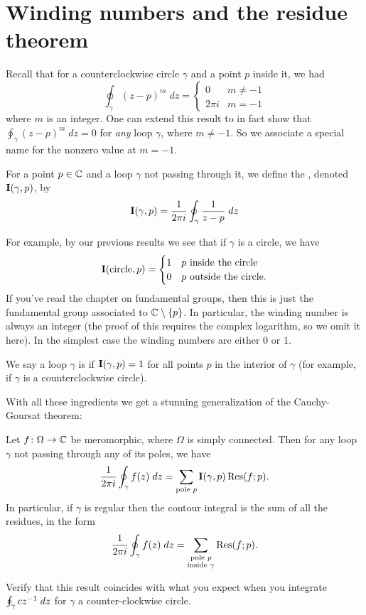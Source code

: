 \section{Winding numbers and the residue theorem}
Recall that for a counterclockwise circle $\gamma$ and a point $p$ inside it, we had
\[
	\oint_{\gamma} (z-p)^m \; dz =
	\begin{cases}
		0 & m \neq -1 \\
		2\pi i & m = -1
	\end{cases}
\]
where $m$ is an integer.
One can extend this result to in fact show that $\oint_\gamma (z-p)^m \; dz = 0$
for \emph{any} loop $\gamma$, where $m \neq -1$.
So we associate a special name for the nonzero value at $m=-1$.
\begin{definition}
	For a point $p \in \mathbb C$ and a loop $\gamma$ not passing through it,
	we define the , denoted $\operatorname{\mathbf I}(\gamma, p)$, by
	\[
		\operatorname{\mathbf I}(\gamma, p) = \frac{1}{2\pi i} \oint_{\gamma} \frac{1}{z-p} \; dz
	\]
\end{definition}
For example, by our previous results we see that if $\gamma$ is a circle, we have
\[
	\operatorname{\mathbf I}(\text{circle}, p)
	=
	\begin{cases}
		1 & \text{$p$ inside the circle} \\
		0 & \text{$p$ outside the circle}.
	\end{cases}
\]
If you've read the chapter on fundamental groups, then this is just the fundamental group
associated to $\mathbb C \setminus \{p\}$.
In particular, the winding number is always an integer (the proof of this requires the complex logarithm,
so we omit it here).
In the simplest case the winding numbers are either $0$ or $1$.
\begin{definition}
	We say a loop $\gamma$ is  if $\operatorname{\mathbf I}(\gamma, p) = 1$
	for all points $p$ in the interior of $\gamma$ (for example,
	if $\gamma$ is a counterclockwise circle).
\end{definition}

With all these ingredients we get a stunning generalization of the Cauchy-Goursat theorem:
\begin{theorem}
	Let $f \colon \Omega \to \mathbb C$ be meromorphic, where $\Omega$ is simply connected.
	Then for any loop $\gamma$ not passing through any of its poles, we have
	\[
		\frac{1}{2\pi i} \oint_{\gamma} f(z) \; dz
		= \sum_{\text{pole $p$}} \operatorname{\mathbf I}(\gamma, p) \operatorname{Res}(f; p).
	\]
	In particular, if $\gamma$ is regular then the contour integral
	is the sum of all the residues, in the form
	\[
		\frac{1}{2\pi i} \oint_{\gamma} f(z) \; dz
		= \sum_{\substack{\text{pole $p$} \\ \text{inside $\gamma$}}}  \operatorname{Res}(f; p).
	\]
\end{theorem}
\begin{ques}
	Verify that this result coincides
	with what you expect when you integrate $\oint_\gamma cz^{-1} \; dz$
	for $\gamma$ a counter-clockwise circle.
\end{ques}

